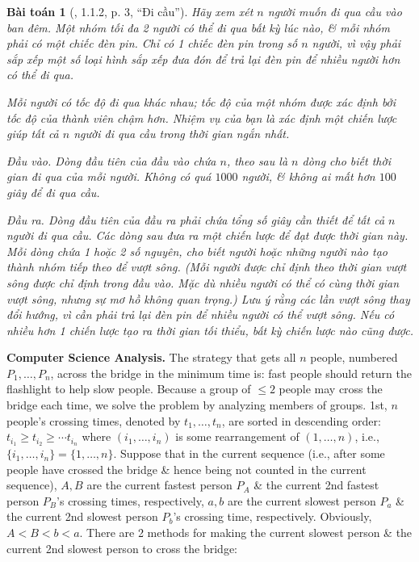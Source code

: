 \documentclass{article}
\newtheorem{baitoan}{Bài toán}
\begin{document}
\begin{baitoan}[\cite{Wu_Wang2018}, 1.1.2, p. 3, ``Đi cầu'']
	Hãy xem xét $n$ người muốn đi qua cầu vào ban đêm. Một nhóm tối đa 2 người có thể đi qua bất kỳ lúc nào, \& mỗi nhóm phải có một chiếc đèn pin. Chỉ có 1 chiếc đèn pin trong số $n$ người, vì vậy phải sắp xếp một số loại hình sắp xếp đưa đón để trả lại đèn pin để nhiều người hơn có thể đi qua.
	
	Mỗi người có tốc độ đi qua khác nhau; tốc độ của một nhóm được xác định bởi tốc độ của thành viên chậm hơn. Nhiệm vụ của bạn là xác định một chiến lược giúp tất cả $n$ người đi qua cầu trong thời gian ngắn nhất.
	\item {\sf Đầu vào.} Dòng đầu tiên của đầu vào chứa $n$, theo sau là $n$ dòng cho biết thời gian đi qua của mỗi người. Không có quá $1000$ người, \& không ai mất hơn $100$ giây để đi qua cầu.
	\item {\sf Đầu ra.} Dòng đầu tiên của đầu ra phải chứa tổng số giây cần thiết để tất cả $n$ người đi qua cầu. Các dòng sau đưa ra một chiến lược để đạt được thời gian này. Mỗi dòng chứa 1 hoặc 2 số nguyên, cho biết người hoặc những người nào tạo thành nhóm tiếp theo để vượt sông. (Mỗi người được chỉ định theo thời gian vượt sông được chỉ định trong đầu vào. Mặc dù nhiều người có thể có cùng thời gian vượt sông, nhưng sự mơ hồ không quan trọng.) Lưu ý rằng các lần vượt sông thay đổi hướng, vì cần phải trả lại đèn pin để nhiều người có thể vượt sông. Nếu có nhiều hơn 1 chiến lược tạo ra thời gian tối thiểu, bất kỳ chiến lược nào cũng được.
\end{baitoan}
\textbf{\textsf{Computer Science Analysis.}} The strategy that gets all $n$ people, numbered $P_1,\ldots,P_n$, across the bridge in the minimum time is: fast people should return the flashlight to help slow people. Because a group of $\le2$ people may cross the bridge each time, we solve the problem by analyzing members of groups. 1st, $n$ people's crossing times, denoted by $t_1,\ldots,t_n$, are sorted in descending order: $t_{i_1}\ge t_{i_2}\ge\cdots t_{i_n}$ where $(i_1,\ldots,i_n)$ is some rearrangement of $(1,\ldots,n)$, i.e., $\{i_1,\ldots,i_n\} = \{1,\ldots,n\}$. Suppose that in the current sequence (i.e., after some people have crossed the bridge \& hence being not counted in the current sequence), $A,B$ are the current fastest person $P_A$ \& the current 2nd fastest person $P_B$'s crossing times, respectively, $a,b$ are the current slowest person $P_a$ \& the current 2nd slowest person $P_b$'s crossing time, respectively. Obviously, $A < B < b < a$. There are 2 methods for making the current slowest person \& the current 2nd slowest person to cross the bridge:
\end{document}
